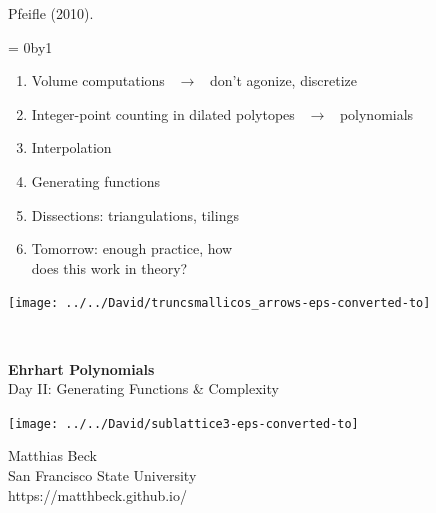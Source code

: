 \documentclass[landscape]{foils}
\def\mybullet{\green $\blacktriangleright$ \black}
\newcounter{frozenpage}
\def\thawpage{
  \count0=\thefrozenpage
  \advance\count0by1
  \renewcommand{\thepage}{\the\count0}
}
\def\green{\color{green}}
\def\blue{\color{blue}}
\def\black{\color{black}}
\def\bm{\blue $}
\def\em{$ \black }
\begin{document}
\vspace{-.35in}
\hspace{5in}
Pfeifle (2010).

\thawpage

\foilhead{\green Recap Day I}

\vspace{-.2in}
\begin{enumerate}[\mybullet]
\item Volume computations \ \bm \longrightarrow \em \ don't agonize, discretize 
\item Integer-point counting in dilated polytopes \ \bm \longrightarrow \em \
polynomials
\item Interpolation
\item Generating functions
\item Dissections: triangulations, tilings
\item Tomorrow: enough practice, how \\ does this work in theory?
\end{enumerate}

\vspace{-3.2in}
\hspace{5.7in}
\texttt{[image: ../../David/truncsmallicos\_arrows-eps-converted-to]}




\newpage
\thispagestyle{empty}
\

\begin{center}
  {\green\LARGE \textbf{Ehrhart Polynomials} \\[12pt]
\normalsize
Day II: Generating Functions \& Complexity}
\end{center}

\vspace{-.2in}
\texttt{[image: ../../David/sublattice3-eps-converted-to]}

\vspace{-4.5in} 
\blue
\hspace{5in}
Matthias Beck
\\[5pt]
\black
\hspace{5in}
San Francisco State University
\\[5pt]
\blue
\hspace{5in}
https://matthbeck.github.io/
\black
\end{document}
